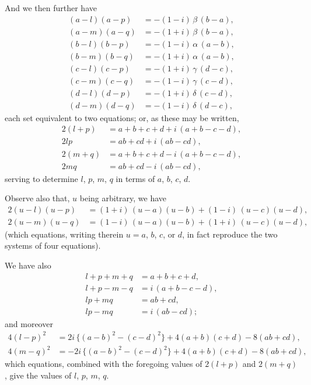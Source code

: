 \documentclass[11pt,a4paper]{book}
\begin{document}
And we then further have
\begin{align*}
(a - l)(a - p) &= -(1 - i)\,\beta\,(b - a), \\
(a - m)(a - q) &= -(1 + i)\,\beta\,(b - a), \\
(b - l)(b - p) &= -(1 - i)\,\alpha\,(a - b), \\
(b - m)(b - q) &= -(1 + i)\,\alpha\,(a - b), \\
(c - l)(c - p) &= -(1 + i)\,\gamma\,(d - c), \\
(c - m)(c - q) &= -(1 - i)\,\gamma\,(c - d), \\
(d - l)(d - p) &= -(1 + i)\,\delta\,(c - d), \\
(d - m)(d - q) &= -(1 - i)\,\delta\,(d - c),
\end{align*}
each set equivalent to two equations; or, as these may be written,
\begin{align*}
2(l + p) &= a + b + c + d + i\,(a + b - c - d), \\
2lp &= ab + cd + i\,(ab - cd), \\
2(m + q) &= a + b + c + d - i\,(a + b - c - d), \\
2mq &= ab + cd - i\,(ab - cd),
\end{align*}
serving to determine $l$, $p$, $m$, $q$ in terms of $a$, $b$, $c$, $d$.

Observe also that, $u$ being arbitrary, we have
\begin{align*}
2(u - l)(u - p) &= (1 + i)\,(u - a)(u - b) + (1 - i)\,(u - c)(u - d), \\
2(u - m)(u - q) &= (1 - i)\,(u - a)(u - b) + (1 + i)\,(u - c)(u - d),
\end{align*}
(which equations, writing therein $u = a$, $b$, $c$, or $d$, in fact reproduce the two systems of four equations).

We have also
\begin{align*}
l + p + m + q &= a + b + c + d, \\
l + p - m - q &= i\,(a + b - c - d), \\
lp + mq &= ab + cd, \\
lp - mq &= i\,(ab - cd);
\end{align*}
and moreover
\begin{align*}
4(l - p)^{2} &= 2i\,\{(a-b)^{2} - (c-d)^{2}\} + 4(a+b)(c+d) - 8(ab+cd), \\
4(m - q)^{2} &= -2i\,\{(a-b)^{2} - (c-d)^{2}\} + 4(a+b)(c+d) - 8(ab+cd),
\end{align*}
which equations, combined with the foregoing values of $2(l+p)$ and $2(m+q)$, give the values of $l$, $p$, $m$, $q$.
\end{document}
